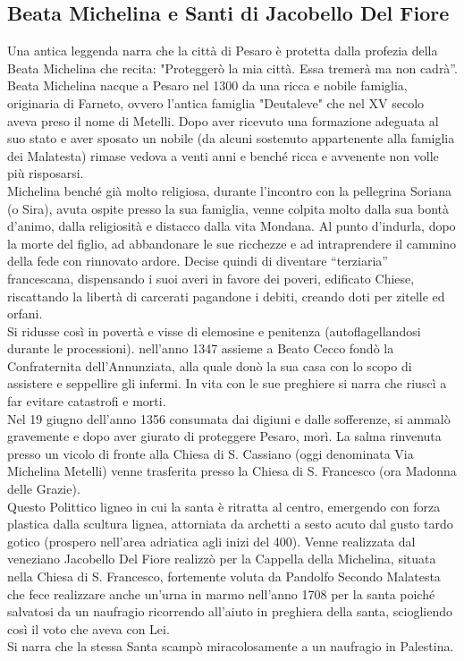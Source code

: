 \documentclass[hidelinks,12pt,a4paper]{article}
\begin{document}
\begin{flushleft}
		\subsection{Beata Michelina e Santi di Jacobello Del Fiore}
		Una antica leggenda narra che la città di Pesaro è protetta dalla profezia della Beata Michelina che recita: "Proteggerò la mia città. Essa tremerà ma non cadrà”.\\
		Beata Michelina nacque a Pesaro nel 1300 da una ricca e nobile famiglia, originaria di Farneto, ovvero l’antica famiglia "Deutaleve" che nel XV secolo aveva preso il nome di Metelli. Dopo aver ricevuto una formazione adeguata al suo stato e aver sposato un nobile (da alcuni sostenuto appartenente alla famiglia dei Malatesta) rimase vedova a venti anni e benché ricca e avvenente non volle più risposarsi.\\
		Michelina benché già molto religiosa, durante l'incontro con la  pellegrina Soriana (o Sira), avuta ospite presso la sua famiglia, venne colpita molto dalla sua bontà d'animo, dalla religiosità e distacco dalla vita Mondana. Al punto d'indurla, dopo la morte del figlio, ad abbandonare le sue ricchezze e ad intraprendere il cammino della fede con rinnovato ardore. Decise quindi di diventare “terziaria” francescana, dispensando i suoi averi in favore dei poveri, edificato Chiese, riscattando la libertà di carcerati pagandone i debiti, creando doti per zitelle ed orfani.\\
		Si ridusse così in povertà e visse di elemosine e penitenza (autoflagellandosi durante le processioni). nell'anno 1347 assieme a Beato Cecco fondò la Confraternita dell'Annunziata, alla quale donò la sua casa con lo scopo di assistere e seppellire gli infermi. In vita con le sue preghiere si narra che riuscì a far evitare catastrofi e morti.\\
		Nel 19 giugno dell'anno 1356 consumata dai digiuni e dalle sofferenze, si ammalò gravemente e dopo aver giurato di proteggere Pesaro, morì. La salma rinvenuta presso un vicolo di fronte alla Chiesa di S. Cassiano (oggi denominata Via Michelina Metelli) venne trasferita presso la Chiesa di S. Francesco (ora Madonna delle Grazie).\\
		Questo Polittico ligneo in cui la santa è ritratta al centro, emergendo con forza plastica dalla scultura lignea, attorniata da archetti a sesto acuto dal gusto tardo gotico (prospero nell'area adriatica agli inizi del 400). Venne realizzata dal veneziano Jacobello Del Fiore realizzò per la Cappella della Michelina, situata nella Chiesa di S. Francesco, fortemente voluta da Pandolfo Secondo Malatesta che fece realizzare anche un'urna in marmo nell'anno 1708 per la santa poiché salvatosi da un naufragio ricorrendo all'aiuto in preghiera della santa, sciogliendo così il voto che aveva con Lei.\\
		Si narra che la stessa Santa scampò miracolosamente a un naufragio in Palestina.
		

\end{flushleft}
\end{document}
